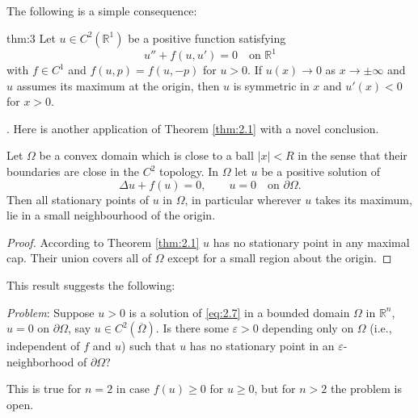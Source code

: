 The following is a simple consequence:


\begin{theorempp}{thm:3}
  Let $u\in C^2(\mathbb{R}^1)$ be a positive function satisfying
  \[u'' + f(u,u') = 0\quad\text{on } \mathbb{R}^1\]
  with $f\in C^1$ and $f(u,p) = f(u,-p)$ for $u>0$.
  If $u(x)\to 0$ as $x\to \pm\infty$ and $u$ assumes its maximum at the origin,
  then $u$ is symmetric in $x$ and $u'(x)<0$ for $x>0$.
\end{theorempp}

. Here is another application of Theorem \ref{thm:2.1} with a novel conclusion.

\begin{corollary}\label{cor:3}
  Let $\Omega$ be a convex domain which is close to a ball $|x|<R$
  in the sense that their boundaries are close in the $C^2$ topology.
  In $\Omega$ let $u$ be a positive solution of
  \begin{equation}\label{eq:2.7}
    \Delta u + f(u) = 0,\qquad u=0\quad \text{on }\partial\Omega.
  \end{equation}
  Then all stationary points of $u$ in $\Omega$, in particular wherever $u$ takes its maximum,
  lie in a small neighbourhood of the origin.
\end{corollary}

\begin{proof}
  According to Theorem \ref{thm:2.1} $u$ has no stationary point in any maximal cap.
  Their union covers all of $\Omega$ except for a small region about the origin.
\end{proof}

This result suggests the following:
\medskip

\noindent
\textit{Problem}: Suppose $u>0$ is a solution of \eqref{eq:2.7}
in a bounded domain $\Omega$ in $\mathbb{R}^n$, $u=0$ on $\partial\Omega$,
say $u\in C^2(\overline{\Omega})$. Is there some $\varepsilon>0$
depending only on $\Omega$ (i.e., independent of $f$ and $u$) such that
$u$ has no stationary point in an $\varepsilon$-neighborhood of $\partial\Omega$?

This is true for $n=2$ in case $f(u)\geq 0$ for $u\geq 0$,
but for $n>2$ the problem is open.

